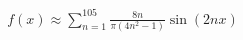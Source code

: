 \documentclass[preview]{standalone}
\begin{document}
\begin{align*}
f(x) \approx \sum_{n=1}^{105} \frac{8n}{\pi(4n^2-1)} \sin(2nx)
\end{align*}
\end{document}

